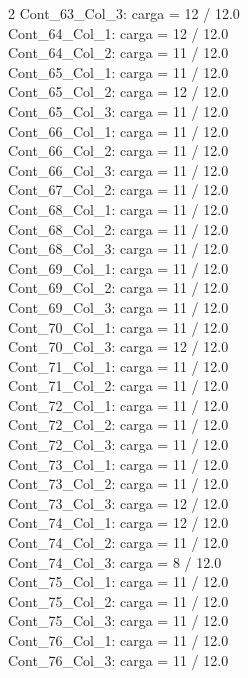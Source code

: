 \begin{multicols}{2}
Cont\_63\_Col\_3: carga = 12 / 12.0\\
Cont\_64\_Col\_1: carga = 12 / 12.0\\
Cont\_64\_Col\_2: carga = 11 / 12.0\\
Cont\_65\_Col\_1: carga = 11 / 12.0\\
Cont\_65\_Col\_2: carga = 12 / 12.0\\
Cont\_65\_Col\_3: carga = 11 / 12.0\\
Cont\_66\_Col\_1: carga = 11 / 12.0\\
Cont\_66\_Col\_2: carga = 11 / 12.0\\
Cont\_66\_Col\_3: carga = 11 / 12.0\\
Cont\_67\_Col\_2: carga = 11 / 12.0\\
Cont\_68\_Col\_1: carga = 11 / 12.0\\
Cont\_68\_Col\_2: carga = 11 / 12.0\\
Cont\_68\_Col\_3: carga = 11 / 12.0\\
Cont\_69\_Col\_1: carga = 11 / 12.0\\
Cont\_69\_Col\_2: carga = 11 / 12.0\\
Cont\_69\_Col\_3: carga = 11 / 12.0\\
Cont\_70\_Col\_1: carga = 11 / 12.0\\
Cont\_70\_Col\_3: carga = 12 / 12.0\\
Cont\_71\_Col\_1: carga = 11 / 12.0\\
Cont\_71\_Col\_2: carga = 11 / 12.0\\
Cont\_72\_Col\_1: carga = 11 / 12.0\\
Cont\_72\_Col\_2: carga = 11 / 12.0\\
Cont\_72\_Col\_3: carga = 11 / 12.0\\
Cont\_73\_Col\_1: carga = 11 / 12.0\\
Cont\_73\_Col\_2: carga = 11 / 12.0\\
Cont\_73\_Col\_3: carga = 12 / 12.0\\
Cont\_74\_Col\_1: carga = 12 / 12.0\\
Cont\_74\_Col\_2: carga = 11 / 12.0\\
Cont\_74\_Col\_3: carga = 8 / 12.0\\
Cont\_75\_Col\_1: carga = 11 / 12.0\\
Cont\_75\_Col\_2: carga = 11 / 12.0\\
Cont\_75\_Col\_3: carga = 11 / 12.0\\
Cont\_76\_Col\_1: carga = 11 / 12.0\\
Cont\_76\_Col\_3: carga = 11 / 12.0\\

\end{multicols}

